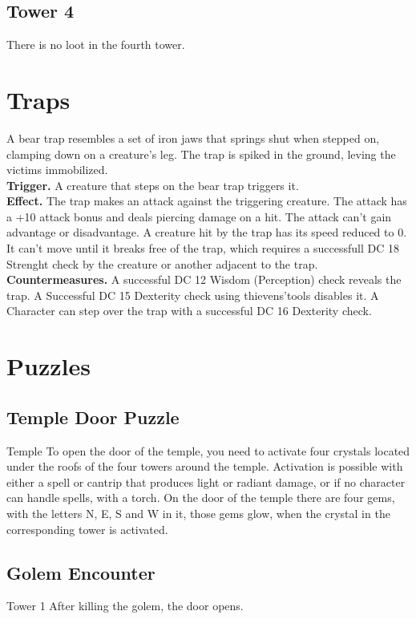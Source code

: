\documentclass[a4paper,10pt,twoside,twocolumn,bg=print]{dndbook} %
\begin{document}
		\subsection{Tower 4}
			There is no loot in the fourth tower.
	\vfill
	\pagebreak
	\section{Traps}
		A bear trap resembles a set of iron jaws that springs shut when stepped on, clamping down on a creature's leg. The trap is spiked in the ground, leving the victims immobilized.\\
		\textbf{Trigger.} A creature that steps on the bear trap triggers it.\\
		\textbf{Effect.} The trap makes an attack against the triggering creature. The attack has a +10 attack bonus and deals  piercing damage on a hit. The attack can't gain advantage or disadvantage. A creature hit by the trap has its speed reduced to 0. It can't move until it breaks free of the trap, which requires a successfull DC 18 Strenght check by the creature or another adjacent to the trap.\\
		\textbf{Countermeasures.} A successful DC 12 Wisdom (Perception) check reveals the trap. A Successful DC 15 Dexterity check using thievens'tools disables it. A Character can step over the trap with a successful DC 16 Dexterity check.
	\vfill
	\pagebreak
	\section{Puzzles}
		\subsection{Temple Door Puzzle}
			Temple\linebreak
			To open the door of the temple, you need to activate four crystals located under the roofs of the four towers around the temple. Activation is possible with either a spell or cantrip that produces light or radiant damage, or if no character can handle spells, with a torch. On the door of the temple there are four gems, with the letters N, E, S and W in it, those gems glow, when the crystal in the corresponding tower is activated. 
		\subsection{Golem Encounter}
			Tower 1\linebreak
			After killing the golem, the door opens.
\end{document}
